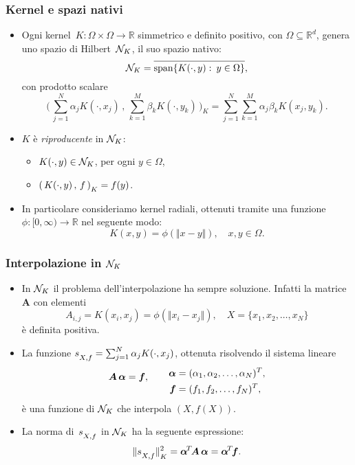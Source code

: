 \documentclass[10pt]{beamer}
\theoremstyle{definition}
\theoremstyle{plain}
\def\R{\mathbb R}
\def\Cal#1{{\cal #1}}
\def\form#1#2{(\,#1\,,\,#2\,)}
\def\Bform#1#2{\biggl(\,#1\,,\,#2\,\biggr)}
\def\norm#1{\Vert #1\Vert}
\def\hbyw#1#2{\vbox to #1{\vfil \hbox to #2{\hfil}}}
\def\lK{{\lower.5ex\hbox{$\scriptstyle K$}}}
\def\lXf{{\lower.5ex\hbox{$\scriptstyle X, f$}}}
\begin{document}
\begin{frame}
\frametitle{Kernel e spazi nativi}
\begin{itemize}
\item
Ogni \alert{kernel}~$K:\Omega\times\Omega\to\R$ simmetrico e definito positivo, con $\Omega\subseteq\R^d$, genera uno spazio di Hilbert~$\Cal N_K$, il suo \alert{spazio nativo}:
$$
\Cal N_K = \overline{\operatorname{span}\{K(\cdot, y):\> y\in\Omega\}\hbyw{2ex}{0em}},
$$
con prodotto scalare
$$
\Bform{\sum_{j=1}^N\alpha_jK(\cdot, x_j)}{\sum_{k=1}^M\beta_k K(\cdot,y_k)}_{\!\!K} =  \sum_{j=1}^N\sum_{k=1}^M \alpha_j \beta_k K(x_j,y_k).
$$


\item
$K$ è \emph{riproducente} in $\Cal N_K$:
\begin{itemize}
\item $K(\cdot, y) \in\Cal N_K$, \quad per ogni $y\in\Omega$,
\item  $\form{K(\cdot, y)}f_{\lK} = f(y)$.
\end{itemize}

\medskip\item
In particolare consideriamo kernel \alert{radiali}, ottenuti tramite una funzione  $\phi:[0,\infty)\to\R$ nel seguente modo:
$$
K(x, y) = \phi(\norm{x - y}), \quad x,y\in\Omega.
$$
\end{itemize}
\end{frame}

\begin{frame}
\frametitle{Interpolazione in $\Cal N_K$}
\begin{itemize}
\item 
In $\Cal N_K$ il problema dell’interpolazione ha sempre soluzione.  Infatti la matrice $\bm A$ con elementi
$$
A_{i,j} = K(x_i, x_j) = \phi( \norm{x_i-x_j}), \quad  X=\{x_1,x_2,\dots,x_N\}
$$
è definita positiva.

\item
La funzione $s_\lXf = \sum_{j=1}^N \alpha_j K(\cdot, x_j)$, ottenuta risolvendo il sistema lineare
 $$
 \bm A\,\bm\alpha = \bm f, \qquad  \lower1ex\hbox{$\begin{aligned} 
 								\bm\alpha &= (\alpha_1,\alpha_2,\dots,\alpha_N)^T, \\
								\bm f &= (f_1,f_2,\dots,f_N)^T,
								\end{aligned}$}
$$
è una funzione di $\Cal N_K$ che interpola $(X, f(X))$.
\item
La norma di~$s_\lXf$ in $\Cal N_K$ ha la seguente espressione:
$$
\norm{s_\lXf}^2_\lK= \bm\alpha^{\!T\!}\bm A\,\bm\alpha = \bm\alpha^{\!T\!}\bm f.
$$
\end{itemize}
\end{frame}
\end{document}
